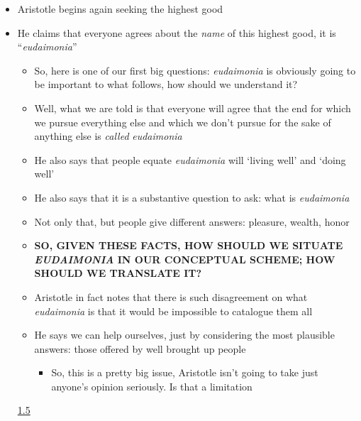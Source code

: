 \documentclass[11pt]{article}
\begin{document}
\begin{itemize}\item{Aristotle begins again seeking the highest good}\item{He claims that everyone agrees about the \emph{name} of this highest good, it is ``\emph{eudaimonia}''}\begin{itemize}\item{So, here is one of our first big questions: \emph{eudaimonia} is obviously going to be important to what follows, how should we understand it?}\item{Well, what we are told is that everyone will agree that the end for which we pursue everything else and which we don't pursue for the sake of anything else is \emph{called} \emph{eudaimonia}}\item{He also says that people equate \emph{eudaimonia} will `living well' and `doing well'}\item{He also says that it is a substantive question to ask: what is \emph{eudaimonia}}\item{Not only that, but people give different answers: pleasure, wealth, honor}\item{\textbf{SO, GIVEN THESE FACTS, HOW SHOULD WE SITUATE \emph{EUDAIMONIA} IN OUR CONCEPTUAL SCHEME; HOW SHOULD WE TRANSLATE IT?}}\item{Aristotle in fact notes that there is such disagreement on what \emph{eudaimonia} is that it would be impossible to catalogue them all}\item{He says we can help ourselves, just by considering the most plausible answers: those offered by well brought up people}\begin{itemize}\item{So, this is a pretty big issue, Aristotle isn't going to take just anyone's opinion seriously. Is that a limitation}\end{itemize}\end{itemize}

\noindent\underline{1.5}


\end{itemize}
\end{document}
